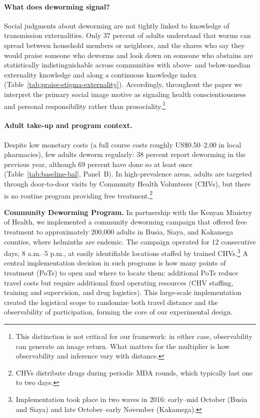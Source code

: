 \documentclass[12pt,a4paper]{article}
\begin{document}
\paragraph{What does deworming signal?}
Social judgments about deworming are not tightly linked to knowledge of transmission externalities. Only 37 percent of adults understand that worms can spread between household members or neighbors, and the shares who say they would praise someone who deworms and look down on someone who abstains are statistically indistinguishable across communities with above- and below-median externality knowledge and along a continuous knowledge index (Table~\ref{tab:praise-stigma-externality}). Accordingly, throughout the paper we interpret the primary social image motive as signaling health conscientiousness and personal responsibility rather than prosociality.\footnote{This distinction is not critical for our framework: in either case, observability can generate an image return. What matters for the multiplier is how observability and inference vary with distance.}

\paragraph{Adult take-up and program context.}
Despite low monetary costs (a full course costs roughly US\$0.50--2.00 in local pharmacies), few adults deworm regularly: 38 percent report deworming in the previous year, although 69 percent have done so at least once (Table~\ref{tab:baseline-bal}, Panel~B). In high-prevalence areas, adults are targeted through door-to-door visits by Community Health Volunteers (CHVs), but there is no routine program providing free treatment.\footnote{CHVs distribute drugs during periodic MDA rounds, which typically last one to two days.}

\vspace{0.5em}
\noindent\textbf{Community Deworming Program.}
In partnership with the Kenyan Ministry of Health, we implemented a community deworming campaign that offered free treatment to approximately 200{,}000 adults in Busia, Siaya, and Kakamega counties, where helminths are endemic. The campaign operated for 12 consecutive days, 8 a.m.--5 p.m., at easily identifiable locations staffed by trained CHVs.\footnote{Implementation took place in two waves in 2016: early--mid October (Busia and Siaya) and late October--early November (Kakamega).} A central implementation decision in such programs is how many points of treatment (PoTs) to open and where to locate them: additional PoTs reduce travel costs but require additional fixed operating resources (CHV staffing, training and supervision, and drug logistics). This large-scale implementation created the logistical scope to randomize both travel distance and the observability of participation, forming the core of our experimental design. 
\end{document}
